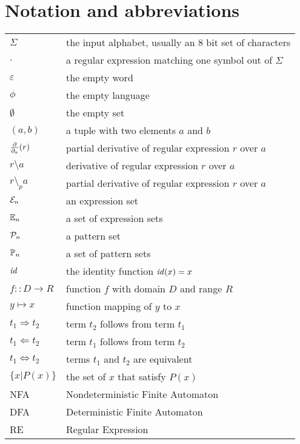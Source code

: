 \chapter*{Notation and abbreviations}


\begin{tabular}{ll}
   $\Sigma$ & the input alphabet, usually an 8 bit set of characters \\
   $.$ & a regular expression matching one symbol out of $\Sigma$ \\
   $\varepsilon$ & the empty word \\
   $\phi$ & the empty language \\
   $\emptyset$ & the empty set \\
   $(a,b)$ & a tuple with two elements $a$ and $b$ \\
   $\frac{\partial}{\partial_{a}}(r)$ & partial derivative of regular expression $r$ over $a$ \\
   $r \setminus a$ & derivative of regular expression $r$ over $a$ \\
   $r \setminus_p a$ & partial derivative of regular expression $r$ over $a$ \\
   $\mathcal{E}_n$ & an expression set \\
   $\mathbb{E}_n$ & a set of expression sets \\
   $\mathcal{P}_n$ & a pattern set \\
   $\mathbb{P}_n$ & a set of pattern sets \\
   $\mathit{id}$ & the identity function $\mathit{id}(x) = x$ \\
   $f :: D \to R$ & function $f$ with domain $D$ and range $R$ \\
   $y \mapsto x$ & function mapping of $y$ to $x$ \\
   $t_1 \Rightarrow t_2$ & term $t_2$ follows from term $t_1$ \\
   $t_1 \Leftarrow t_2$ & term $t_1$ follows from term $t_2$ \\
   $t_1 \Leftrightarrow t_2$ & terms $t_1$ and $t_2$ are equivalent \\
   $\{ x | P(x) \}$ & the set of $x$ that satisfy $P(x)$ \\
   NFA & Nondeterministic Finite Automaton \\
   DFA & Deterministic Finite Automaton \\
   RE & Regular Expression \\
\end{tabular}



